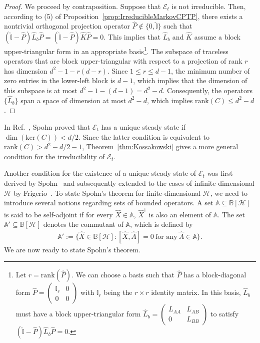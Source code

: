 \documentclass[preprint,pteplogo]{ptephy_v2}%
\numberwithin{equation}{section}
\theoremstyle{definition}
\newcommand{\mc}[1]{\mathcal{#1}}
\newcommand{\mbb}[1]{\mathbb{#1}}
\begin{document}
\begin{proof}
We proceed by contraposition. 
Suppose that $\mc{E}_t$ is not irreducible. 
Then, according to (5) of Proposition~\ref{prop:IrreducibleMarkovCPTP}, there exists a nontrivial orthogonal projection operator $\hat{P} \notin \{ 0, \hat{\mbb{I}} \}$ such that $(\hat{\mbb{I}}-\hat{P}) \hat{L}_b \hat{P} = (\hat{\mbb{I}}-\hat{P}) \hat{K} \hat{P} = 0$.
This implies that $\hat{L}_b$ and $\hat{K}$ assume a block upper-triangular form in an appropriate basis\footnote{
Let $r = \textrm{rank}(\hat{P})$.
We can choose a basis such that $\hat{P}$ has a block-diagonal form $\hat{P} = \begin{pmatrix} \mbb{I}_r & 0 \\ 0 & 0 \end{pmatrix}$ with $\mbb{I}_r$ being the $r \times r$ identity matrix.
In this basis, $\hat{L}_b$ must have a block upper-triangular form $\hat{L}_b = \begin{pmatrix} L_{AA} & L_{AB} \\ 0 & L_{BB} \end{pmatrix}$ to satisfy $(\hat{\mbb{I}}-\hat{P}) \hat{L}_b \hat{P} = 0$.
}.
The subspace of traceless operators that are block upper-triangular with respect to a projection of rank $r$ has dimension $d^2-1 - r(d-r)$.
Since $1 \leq r \leq d-1$, the minimum number of zero entries in the lower-left block is $d-1$, which implies that the dimension of this subspace is at most $d^2-1 - (d-1) = d^2-d$.
Consequently, the operators $\{ \hat{L}_b \}$ span a space of dimension at most $d^2-d$, which implies $\textrm{rank}(C) \leq d^2-d$.
\end{proof}

In Ref.~\cite{spohn1976approach}, Spohn proved that $\mc{E}_t$ has a unique steady state if $\dim (\textrm{ker}(C)) < d/2$. 
Since the latter condition is equivalent to $\textrm{rank}(C) > d^2 -d/2-1$, Theorem~\ref{thm:Kossakowski} gives a more general condition for the irreducibility of $\mc{E}_t$.

Another condition for the existence of a unique steady state of $\mc{E}_t$ was first derived by Spohn~\cite{spohn1977algebraic} and subsequently extended to the cases of infinite-dimensional $\mc{H}$ by Frigerio~\cite{frigerio1978stationary}.
To state Spohn's theorem for finite-dimensional $\mc{H}$, we need to introduce several notions regarding sets of bounded operators.
A set $\mbb{A} \subseteq \mbb{B}[\mc{H}]$ is said to be self-adjoint if for every $\hat{X} \in \mbb{A}$, $\hat{X}^\dagger$ is also an element of $\mbb{A}$.
The set $\mbb{A}' \subseteq \mbb{B}[\mc{H}]$ denotes the commutant of $\mbb{A}$, which is defined by
\begin{align}
\mbb{A}' := \{ \hat{X} \in \mbb{B}[\mc{H}] : [\hat{X}, \hat{A}]=0 \ \textrm{for any} \ \hat{A} \in \mbb{A} \}.
\end{align}
We are now ready to state Spohn's theorem.
\end{document}
